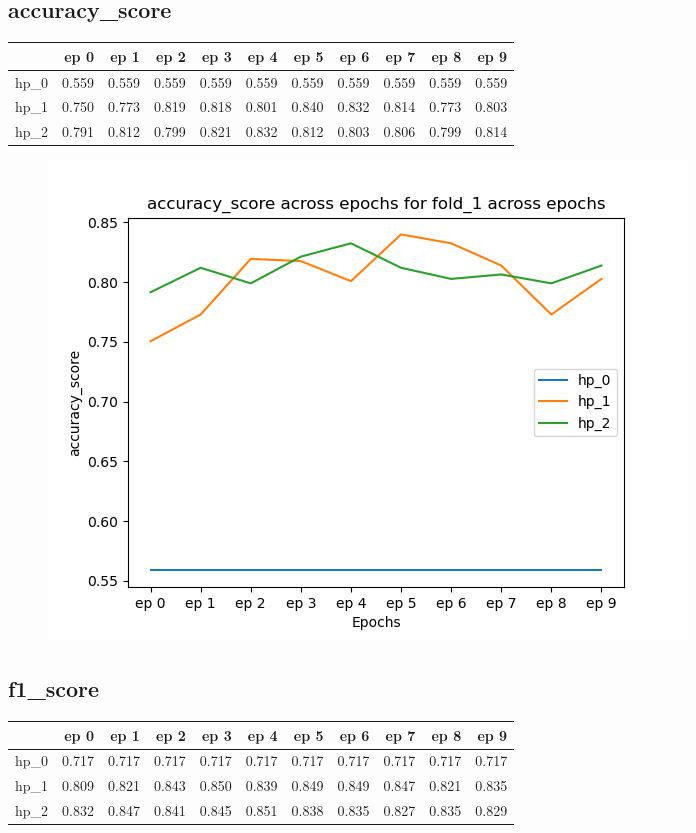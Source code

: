 \documentclass{article}
\begin{document}
\subsection{accuracy\_score}
\begin{tabular}{lrrrrrrrrrr}
\toprule
{} &   ep 0 &   ep 1 &   ep 2 &   ep 3 &   ep 4 &   ep 5 &   ep 6 &   ep 7 &   ep 8 &   ep 9 \\
\midrule
hp\_0 &  0.559 &  0.559 &  0.559 &  0.559 &  0.559 &  0.559 &  0.559 &  0.559 &  0.559 &  0.559 \\
hp\_1 &  0.750 &  0.773 &  0.819 &  0.818 &  0.801 &  0.840 &  0.832 &  0.814 &  0.773 &  0.803 \\
hp\_2 &  0.791 &  0.812 &  0.799 &  0.821 &  0.832 &  0.812 &  0.803 &  0.806 &  0.799 &  0.814 \\
\bottomrule
\end{tabular}

\begin{figure}[H]
\includegraphics[scale = 0.75]{fold_1/accuracy_score}
\end{figure}
\subsection{f1\_score}
\begin{tabular}{lrrrrrrrrrr}
\toprule
{} &   ep 0 &   ep 1 &   ep 2 &   ep 3 &   ep 4 &   ep 5 &   ep 6 &   ep 7 &   ep 8 &   ep 9 \\
\midrule
hp\_0 &  0.717 &  0.717 &  0.717 &  0.717 &  0.717 &  0.717 &  0.717 &  0.717 &  0.717 &  0.717 \\
hp\_1 &  0.809 &  0.821 &  0.843 &  0.850 &  0.839 &  0.849 &  0.849 &  0.847 &  0.821 &  0.835 \\
hp\_2 &  0.832 &  0.847 &  0.841 &  0.845 &  0.851 &  0.838 &  0.835 &  0.827 &  0.835 &  0.829 \\
\bottomrule
\end{tabular}
\end{document}
